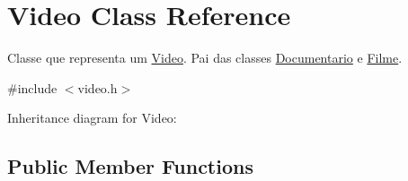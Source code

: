 \hypertarget{classVideo}{}\section{Video Class Reference}
\label{classVideo}


Classe que representa um \hyperlink{classVideo}{Video}. Pai das classes \hyperlink{classDocumentario}{Documentario} e \hyperlink{classFilme}{Filme}.  




{\ttfamily \#include $<$video.\+h$>$}



Inheritance diagram for Video\+:
\subsection*{Public Member Functions}
